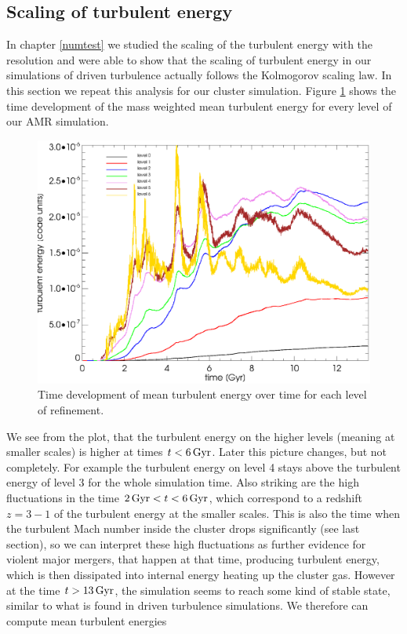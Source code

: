 \subsection{Scaling of turbulent energy}
In chapter \ref{numtest} we studied the scaling of the turbulent energy
with the resolution and were able to show that the scaling
of turbulent energy in our simulations of driven turbulence actually follows
the Kolmogorov scaling law. In this section we repeat this analysis for our 
cluster simulation. Figure \ref{fig:tuerescluster} shows the time development of
the mass weighted mean turbulent energy for every level of our AMR simulation. 
\begin{figure}[tp]
\centering
\includegraphics[width=0.7\linewidth]{chapter9/tuemwrescluster128sar.eps}
\caption{Time development of mean turbulent energy over time for each level of
refinement.}
\label{fig:tuerescluster}
\end{figure}
We see from the plot, that the turbulent energy on the higher levels (meaning
at smaller scales) is higher at times $t<\unit[6]{Gyr}$. Later this picture
changes, but not completely. For example the turbulent energy on level 4 stays
above the turbulent energy of level 3 for the whole simulation time. Also
striking are the high fluctuations in the time $\unit[2]{Gyr}<t<\unit[6]{Gyr}$,
which correspond to a redshift $z=3-1$ of the turbulent energy at the smaller
scales. This is also the time when the turbulent Mach number inside the
cluster drops significantly (see last section), so we can interpret these high
fluctuations as further evidence for violent major mergers, that happen at that
time, producing turbulent energy, which is then dissipated into internal energy
heating up the cluster gas. However at the time $t>\unit[13]{Gyr}$, the
simulation seems to reach some kind of stable state, similar to what is found in
driven turbulence simulations. We therefore can compute mean turbulent energies
